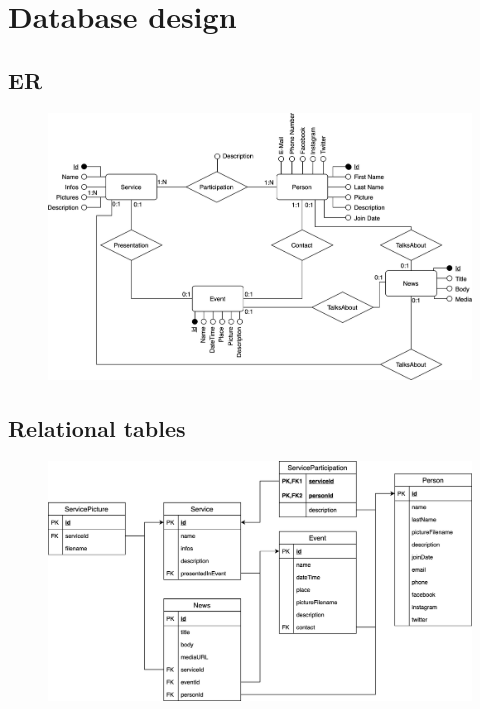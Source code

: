 \documentclass[a4paper, 11pt, parskip=half, headsepline]{scrreprt}
\begin{document}
\chapter{Database design}

\section{ER}

\begin{figure}[H]
    \centering
    \includegraphics[width=0.72\linewidth, keepaspectratio]{DB/ER}
\end{figure}

\section{Relational tables}

\begin{figure}[H]
    \centering
    \includegraphics[width=0.72\linewidth, keepaspectratio]{DB/RelationalTables}
\end{figure}
\end{document}
